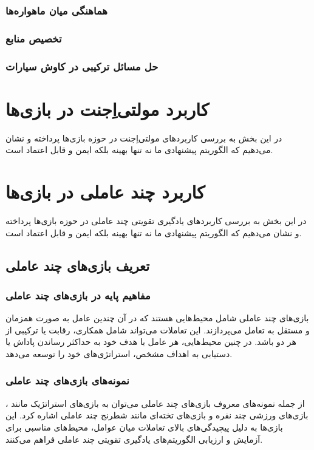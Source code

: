 \subsubsection{هماهنگی میان ماهواره‌ها}

\subsubsection{تخصیص منابع}

\subsubsection{حل مسائل ترکیبی در کاوش سیارات}


\section{کاربرد مولتی‌اِجنت در بازی‌ها}

در این بخش به بررسی کاربردهای مولتی‌اِجنت در حوزه بازی‌ها پرداخته و نشان می‌دهیم که الگوریتم پیشنهادی ما نه تنها بهینه بلکه ایمن و قابل اعتماد است.

\section{کاربرد چند عاملی در بازی‌ها}

در این بخش به بررسی کاربردهای یادگیری تقویتی چند عاملی در حوزه بازی‌ها پرداخته و نشان می‌دهیم که الگوریتم پیشنهادی ما نه تنها بهینه بلکه ایمن و قابل اعتماد است.

\subsection{تعریف بازی‌های چند عاملی}
\subsubsection{مفاهیم پایه در بازی‌های چند عاملی}
بازی‌های چند عاملی شامل محیط‌هایی هستند که در آن چندین عامل به صورت همزمان و مستقل به تعامل می‌پردازند. این تعاملات می‌تواند شامل همکاری، رقابت یا ترکیبی از هر دو باشد. در چنین محیط‌هایی، هر عامل با هدف خود به حداکثر رساندن پاداش یا دستیابی به اهداف مشخص، استراتژی‌های خود را توسعه می‌دهد.

\subsubsection{نمونه‌های بازی‌های چند عاملی}
از جمله نمونه‌های معروف بازی‌های چند عاملی می‌توان به بازی‌های استراتژیک مانند ، بازی‌های ورزشی چند نفره و بازی‌های تخته‌ای مانند شطرنج چند عاملی اشاره کرد. این بازی‌ها به دلیل پیچیدگی‌های بالای تعاملات میان عوامل، محیط‌های مناسبی برای آزمایش و ارزیابی الگوریتم‌های یادگیری تقویتی چند عاملی فراهم می‌کنند.

